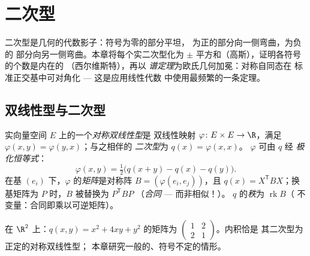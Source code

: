 \chapter{二次型}\label{ch:b2:quadratic}

二次型是几何的代数影子：符号为零的部分平坦，
为正的部分向一侧弯曲，为负的
部分向另一侧弯曲。本章将每个实二次型化为
$\pm$ 平方和（高斯），证明各符号的个数是内在的
（西尔维斯特），再以
\emph{谱定理}为欧氏几何加冕：对称自同态在
标准正交基中可对角化 --- 这是应用线性代数
中使用最频繁的一条定理。

\section{双线性型与二次型}

\begin{definition}\label{def:b2:quadratic:def}
实向量空间 $E$ 上的一个\emph{对称双线性型}是
双线性映射 $\varphi \colon E \times E \to \R$，满足 $\varphi(x, y) =
\varphi(y, x)$；与之相伴的
\emph{二次型}为 $q(x) = \varphi(x, x)$。
$\varphi$ 可由 $q$ 经
\emph{极化恒等式}：
\[
\varphi(x, y) = \tfrac12\bigl(q(x + y) - q(x) - q(y)\bigr).
\]
在基 $(e_i)$ 下，$\varphi$ 的\emph{矩阵}是对称阵
$B = (\varphi(e_i, e_j))$，且 $q(x) = X^{\mathsf T} B X$；换基矩阵为
$P$ 时，$B$ 被替换为 $P^{\mathsf T} B P$
（\emph{合同} --- 而非相似！）。
$q$ 的\emph{秩}为 $\operatorname{rk} B$（
不变量：合同即乘以可逆矩阵）。
\end{definition}

\begin{example}
在 $\R^2$ 上：$q(x, y) = x^2 + 4xy + y^2$ 的矩阵为 $\begin{pmatrix}
1 & 2\\ 2 & 1\end{pmatrix}$。内积恰是
其二次型为正定的对称双线性型；
本章研究一般的、符号不定的情形。
\end{example}

